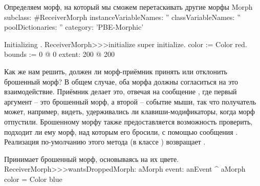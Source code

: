 \documentclass[a4paper,10pt,twoside]{book}
\begin{document}
\begin{classdef}{Определяем морф, на который мы сможем перетаскивать другие морфы}
Morph subclass: #ReceiverMorph
	instanceVariableNames: ''
	classVariableNames: ''
	poolDictionaries: ''
	category: 'PBE-Morphic'
\end{classdef}

\begin{method}{Initializing .}
ReceiverMorph>>>initialize
	super initialize.
	color := Color red.
	bounds := 0 @ 0 extent: 200 @ 200
\end{method}

Как же нам решить, должен ли морф-приёмник принять или отклонить брошенный морф?
В общем случае, оба морфа должны согласиться на это взаимодействие.
Приёмник делает это, отвечая на сообщение , где первый аргумент -- это брошенный морф, а второй -- событие мыши, так что получатель может, например, видеть, удерживались ли клавиши-модификаторы, когда морф отпустили.
Брошенному морфу также предоставляется возможность проверить, подходит ли ему морф, над которым его бросили, с помощью сообщения . Реализация по-умолчанию этого метода (в классе ) возвращает .

\begin{method}{Принимает брошенный морф, основываясь на их цвете.}
ReceiverMorph>>>wantsDroppedMorph: aMorph event: anEvent
	^ aMorph color = Color blue
\end{method}
\end{document}
